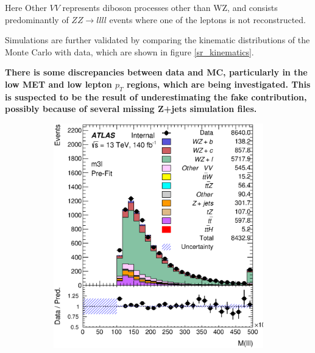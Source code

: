 \documentclass[NOTE, atlasdraft=true, texlive=2016, UKenglish]{\ATLASLATEXPATH atlasdoc}
\begin{document}
Here Other $VV$ represents diboson processes other than WZ, and consists predominantly of $ZZ\rightarrow llll$ events where one of the leptons is not reconstructed.

Simulations are further validated by comparing the kinematic distributions of the Monte Carlo with data, which are shown in figure \ref{sr_kinematics}.

\textbf{There is some discrepancies between data and MC, particularly in the low MET and low lepton $p_T$ regions, which are being investigated. This is suspected to be the result of underestimating the fake contribution, possibly because of several missing Z+jets simulation files.}

\begin{figure}[H]
    \begin{subfigure}{.48\textwidth}
        \includegraphics[width=1\linewidth]{kinematics/m3l.eps}
        \caption{}
        \label{fig:m3l}
    \end{subfigure}%
    \begin{subfigure}{.48\textwidth}

\end{subfigure}
\end{figure}
\end{document}
